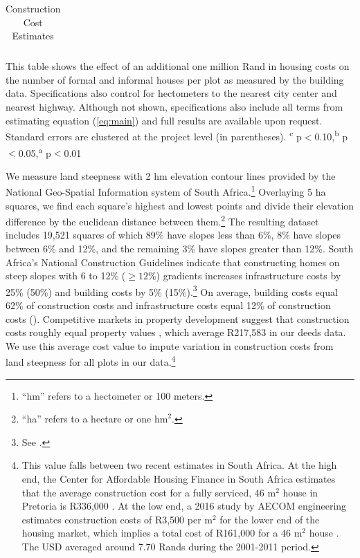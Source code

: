 \documentclass[12pt]{article}
\newcommand{\hmref}{
	``hm'' refers to a hectometer or 100 meters.
}
\newcommand{\haref}{
	``ha'' refers to a hectare or one $\text{hm}^{2}$.
}
\begin{document}
\begin{table}
\small
\centering
\caption{Construction Cost Estimates}\label{table:ccost}
\vspace{-2mm}
\begin{threeparttable}
\begin{tabular}{lCCCCC}
\toprule

\bottomrule
\end{tabular}
\begin{tablenotes}
\item \footnotesize  This table shows the effect of an additional one million Rand in housing costs on the number of formal and informal houses per plot as measured by the building data.  Specifications also control for hectometers to the nearest city center and nearest highway.  Although not shown, specifications also include all terms from estimating equation (\ref{eq:main}) and full results are available upon request.  Standard errors are clustered at the project level (in parentheses). 
\textsuperscript{c} p$<$0.10,\textsuperscript{b} p$<$0.05,\textsuperscript{a} p$<$0.01 \,\,
\end{tablenotes}
\end{threeparttable}
\end{table}


We measure land steepness with 2 hm elevation contour lines provided by the National Geo-Spatial Information system of South Africa.\footnote{\hmref}   Overlaying 5 ha squares, we find each square's highest and lowest points and divide their elevation difference by the euclidean distance between them.\footnote{\haref}   The resulting dataset includes 19,521 squares of which 89\% have slopes less than 6\%, 8\% have slopes between 6\% and 12\%, and the remaining 3\% have slopes greater than 12\%.  South Africa's National Construction Guidelines indicate that constructing homes on steep slopes with 6 to 12\% ($\geq12\%$) gradients increases infrastructure costs by 25\% (50\%) and building costs by 5\% (15\%).\footnote{See \cite{redbook}.}  On average, building costs equal 62\% of construction costs and infrastructure costs equal 12\% of construction costs (\cite{cahfcosts}).  Competitive markets in property development suggest that construction costs roughly equal property values \citep{cahfcosts}, which average R217,583 in our deeds data.  We use this average cost value to impute variation in construction costs from land steepness for all plots in our data.\footnote{This value falls between two recent estimates in South Africa.  At the high end, the Center for Affordable Housing Finance in South Africa estimates that the average construction cost for a fully serviced, 46 $\text{m}^{2}$ house  in Pretoria is R336,000 \citep{cahfcosts}.  At the low end, a 2016 study by AECOM engineering estimates construction costs of R3,500 per $\text{m}^{2}$ for the lower end of the housing market, which implies a total cost of R161,000 for a 46 $\text{m}^{2}$ house \citep{aecom}. The USD averaged around 7.70 Rands during the 2001-2011 period.}  
\end{document}
